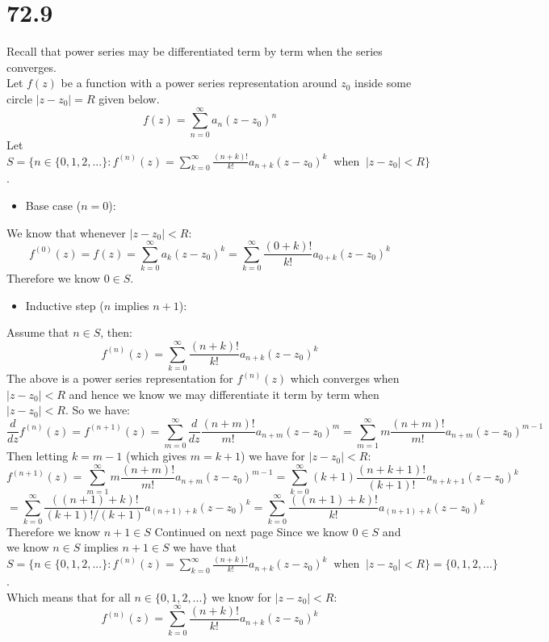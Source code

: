 \documentclass{article}
\begin{document}
\section*{72.9}
\begin{center}
    \doublespacing
    Recall that power series may be differentiated term by term when the series converges.
    \\Let $f(z)$ be a function with a power series representation around $z_0$ inside some circle $|z - z_0| = R$ given below.
    \[f(z) =\sum _{n=0}^{\infty} a_n (z - z_0)^n\]
    Let $S =\{n\in\{0, 1, 2, ...\}: f^{(n)} (z) =\sum _{k=0}^{\infty}\frac{(n + k)!}{k!} a_{n+k} (z - z_0)^k\;\;\text{when}\;\;|z - z_0| < R\}$.
\end{center}
\begin{itemize}
    \item Base case ($n = 0$):
\end{itemize}
\begin{center}
    \doublespacing
    We know that whenever $|z - z_0| < R$:
    \[f^{(0)} (z) = f(z) =\sum _{k=0}^{\infty} a_k (z - z_0)^k =\sum _{k=0}^{\infty}\frac{(0 + k)!}{k!} a_{0+k} (z - z_0)^k\]
    Therefore we know $0\in S$.
\end{center}
\begin{itemize}
    \item Inductive step ($n$ implies $n+1$):
\end{itemize}
\begin{center}
    \doublespacing
    Assume that $n\in S$, then:
    \[f^{(n)} (z) =\sum _{k=0}^{\infty}\frac{(n + k)!}{k!} a_{n+k} (z - z_0)^k\]
    The above is a power series representation for $f^{(n)} (z)$ which converges when $|z - z_0| < R$ and hence we know we may differentiate it term by term when $|z - z_0| < R$.
    So we have:
    \[\frac{d}{dz} f^{(n)} (z) = f^{(n+1)} (z) =\sum _{m=0}^{\infty}\frac{d}{dz}\frac{(n + m)!}{m!} a_{n+m} (z - z_0)^m =\sum _{m=1}^{\infty} m\frac{(n + m)!}{m!} a_{n+m} (z - z_0)^{m-1}\]
    Then letting $k = m - 1$ (which gives $m = k + 1$) we have for $|z - z_0| < R$:
    \[f^{(n+1)} (z) =\sum _{m=1}^{\infty} m\frac{(n + m)!}{m!} a_{n+m} (z - z_0)^{m-1} =\sum _{k=0}^{\infty} (k + 1)\frac{(n + k + 1)!}{(k + 1)!} a_{n+k+1} (z - z_0)^{k}\]
    \[=\sum _{k=0}^{\infty}\frac{((n + 1) + k)!}{(k+1)!/(k+1)} a_{(n+1)+k} (z - z_0)^{k} =\sum _{k=0}^{\infty}\frac{((n + 1) + k)!}{k!} a_{(n+1)+k} (z - z_0)^{k}\]
    Therefore we know $n+1\in S$
    \break
    \newline\newline
    Continued on next page
    \newpage
    Since we know $0\in S$ and we know $n\in S$ implies $n+1\in S$ we have that $S =\{n\in\{0, 1, 2, ...\}: f^{(n)} (z) =\sum _{k=0}^{\infty}\frac{(n + k)!}{k!} a_{n+k} (z - z_0)^k\;\;\text{when}\;\;|z - z_0| < R\} =\{0, 1, 2, ...\}$.
    \\Which means that for all $n\in\{0, 1, 2, ...\}$ we know for $|z - z_0| < R$:
    \[f^{(n)} (z) =\sum _{k=0}^{\infty}\frac{(n + k)!}{k!} a_{n+k} (z - z_0)^k\]
\end{center}
\end{document}

